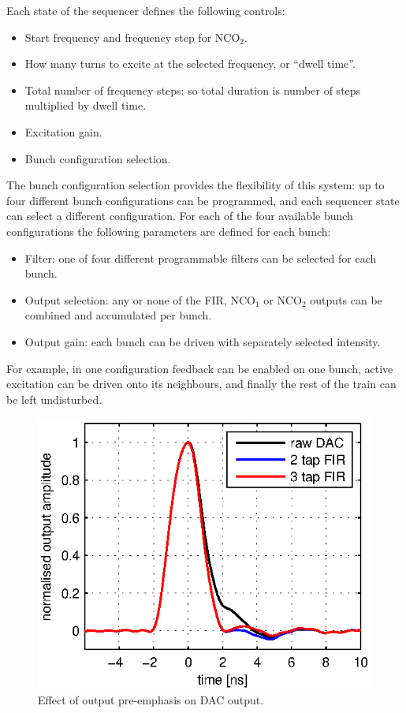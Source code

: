 \documentclass{JAC2003}
\newcommand{\textsubscript}[1]{$_{\text{#1}}$}
\newcommand{\NCO}[1]{NCO\textsubscript{#1}}
\begin{document}
Each state of the sequencer defines the following controls:

\begin{itemize}
\item Start frequency and frequency step for \NCO2.
\item How many turns to excite at the selected frequency, or ``dwell time''.
\item Total number of frequency steps: so total duration is number of steps
multiplied by dwell time.
\item Excitation gain.
\item Bunch configuration selection.
\end{itemize}

The bunch configuration selection provides the flexibility of this system: up to
four different bunch configurations can be programmed, and each sequencer state
can select a different configuration.  For each of the four available bunch
configurations the following parameters are defined for each bunch:

\begin{itemize}
\item Filter: one of four different programmable filters can be selected for
each bunch.
\item Output selection: any or none of the FIR, \NCO1 or \NCO2 outputs can be
combined and accumulated per bunch.
\item Output gain: each bunch can be driven with separately selected intensity.
\end{itemize}

For example, in one configuration feedback can be enabled on one bunch, active
excitation can be driven onto its neighbours, and finally the rest of the train
can be left undisturbed.



\begin{figure}[h]
\centering
\includegraphics{WEPC10f2}
\caption{Effect of output pre-emphasis on DAC output.}
\label{precomp}
\end{figure}
\end{document}

